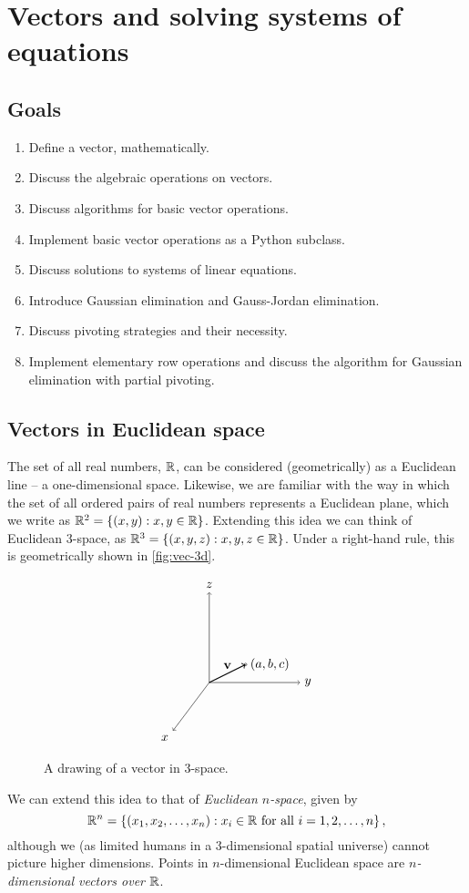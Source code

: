 \documentclass[m3380-lec-main.tex]{subfiles}
\begin{document}
\chapter{Vectors and solving systems of equations}

\section*{Goals}
\begin{enumerate}[1.~]\setlength{\itemsep}{0pt}
\item Define a vector, mathematically.
\item Discuss the algebraic operations on vectors.
\item Discuss algorithms for basic vector operations.
\item Implement basic vector operations as a Python subclass.
\item Discuss solutions to systems of linear equations.
\item Introduce Gaussian elimination and Gauss-Jordan elimination.
\item Discuss pivoting strategies and their necessity.
\item Implement elementary row operations and discuss the algorithm for Gaussian elimination with partial pivoting.
\end{enumerate}

\section{Vectors in Euclidean space}
The set of all real numbers, $\mathbb{R}$, can be considered (geometrically) as a Euclidean line -- a one-dimensional space. Likewise, we are familiar with the way in which the set of all ordered pairs of real numbers represents a Euclidean plane, which we write as $\mathbb{R}^2=\left\{(x,y):x,y\in\mathbb{R}\right\}$. Extending this idea we can think of Euclidean 3-space, as $\mathbb{R}^3=\left\{(x,y,z):x,y,z\in \mathbb{R}\right\}$. Under a right-hand rule, this is geometrically shown in \autoref{fig:vec-3d}.
\begin{figure}[hbt]
\[\begin{tikzpicture}
\draw [->] (0,0) -- (2.5,0) node [right] {$y$};
\draw [->] (0,0) -- (0,2.5) node [above] {$z$};
\draw [->] (0,0) -- (-1,-4/3) node [below left] {$x$};
\draw [thick, ->] (0,0) -- node [pos=.5, above] {$\vec{v}$} (1,.5) node [right] {$(a,b,c)$};
\draw (1,.5) circle [radius=1pt];
\end{tikzpicture}\]
\caption{\label{fig:vec-3d}A drawing of a vector in 3-space.}
\end{figure}
We can extend this idea to that of \emph{Euclidean $n$-space}, given by 
\[\mathbb{R}^n = \left\{(x_1,x_2,\ldots,x_n):x_i\in \mathbb{R}\text{ for all }i=1,2,\ldots,n\right\},\]
although we (as limited humans in a 3-dimensional spatial universe) cannot picture higher dimensions. Points in $n$-dimensional Euclidean space are \emph{$n$-dimensional vectors over $\mathbb{R}$}.
\end{document}
